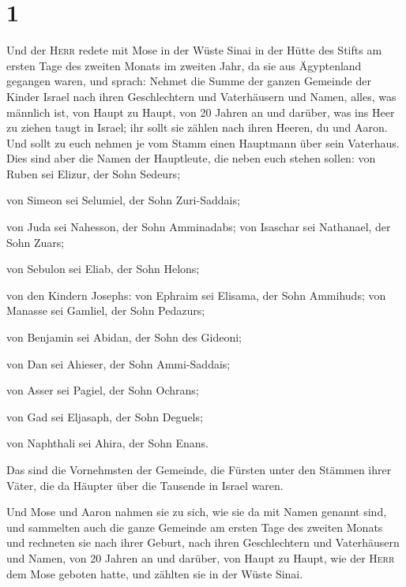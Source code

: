 \hypertarget{section}{%
\section{1}\label{section}}

 Und der \textsc{Herr} redete mit Mose in der Wüste Sinai
in der Hütte des Stifts am ersten Tage des zweiten Monats im zweiten
Jahr, da sie aus Ägyptenland gegangen waren, und sprach: 
Nehmet die Summe der ganzen Gemeinde der Kinder Israel nach ihren
Geschlechtern und Vaterhäusern und Namen, alles, was männlich ist, von
Haupt zu Haupt,  von 20 Jahren an und darüber, was ins
Heer zu ziehen taugt in Israel; ihr sollt sie zählen nach ihren Heeren,
du und Aaron.  Und sollt zu euch nehmen je vom Stamm einen
Hauptmann über sein Vaterhaus.  Dies sind aber die Namen
der Hauptleute, die neben euch stehen sollen: von Ruben sei Elizur, der
Sohn Sedeurs;

 von Simeon sei Selumiel, der Sohn Zuri-Saddais;

 von Juda sei Nahesson, der Sohn Amminadabs;
 von Isaschar sei Nathanael, der Sohn Zuars;

 von Sebulon sei Eliab, der Sohn Helons;

 von den Kindern Josephs: von Ephraim sei Elisama, der
Sohn Ammihuds; von Manasse sei Gamliel, der Sohn Pedazurs;

 von Benjamin sei Abidan, der Sohn des Gideoni;

 von Dan sei Ahieser, der Sohn Ammi-Saddais;

 von Asser sei Pagiel, der Sohn Ochrans;

 von Gad sei Eljasaph, der Sohn Deguels;

 von Naphthali sei Ahira, der Sohn Enans.

 Das sind die Vornehmsten der Gemeinde, die Fürsten unter
den Stämmen ihrer Väter, die da Häupter über die Tausende in Israel
waren.

 Und Mose und Aaron nahmen sie zu sich, wie sie da mit
Namen genannt sind,  und sammelten auch die ganze
Gemeinde am ersten Tage des zweiten Monats und rechneten sie nach ihrer
Geburt, nach ihren Geschlechtern und Vaterhäusern und Namen, von 20
Jahren an und darüber, von Haupt zu Haupt,  wie der
\textsc{Herr} dem Mose geboten hatte, und zählten sie in der Wüste
Sinai.

